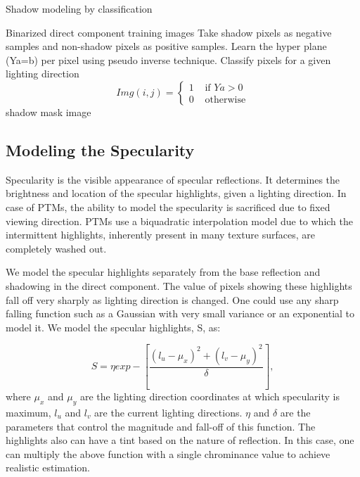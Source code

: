 \begin{algorithm}
\caption{Shadow modeling by classification}
\begin{algorithmic}[1] 
\REQUIRE Binarized direct component training images
\STATE Take shadow pixels as negative samples and non-shadow pixels as positive samples.
\STATE Learn the hyper plane (Ya=b) per pixel using pseudo inverse technique.
\STATE Classify pixels for a given lighting direction
$$
Img(i,j) = \left\{ \begin{array}{rl}
  1 &\mbox{ if $Ya>0$} \\
  0 &\mbox{ otherwise}
       \end{array} \right.
$$
\ENSURE shadow mask image 
\end{algorithmic}
\end{algorithm}


\subsection{Modeling the Specularity}

Specularity is the visible appearance of specular reflections. It determines the
brightness and location of the specular highlights, given a lighting direction.
In case of PTMs, the ability to model the specularity is sacrificed due to fixed
viewing direction. PTMs use a biquadratic interpolation model due to which the
intermittent highlights, inherently present in many texture surfaces, are
completely washed out.

We model the specular highlights separately from the base reflection and
shadowing in the direct component. The value of pixels showing these highlights
fall off very sharply as lighting direction is changed. One could use any sharp
falling function such as a Gaussian with very small variance or an exponential
to model it. We model the specular highlights, S, as:

\begin{equation}
S= \eta exp-\left[\frac{({l_u-\mu_x})^2 + ({l_v-\mu_y})^2}{\delta}\right],
\end{equation}
where $\mu_x$ and $\mu_y$ are the lighting direction coordinates at which
specularity is maximum, $l_u$ and $l_v$ are the current lighting directions.
$\eta$ and $\delta$ are the parameters that control the
magnitude and fall-off of this function. The highlights also can have a tint
based on the nature of reflection. In this case, one can multiply the above
function with a single chrominance value to achieve realistic estimation.

